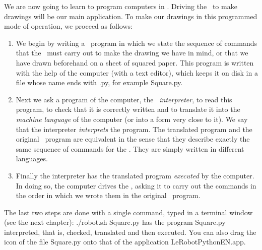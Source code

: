 We are now going to learn to program computers
in \python. Driving the \robot\ to make drawings will be our
main application. To make our drawings in
this programmed mode of operation, we proceed as follows:
\begin{enumerate}
\item We begin by writing a \python\ program in which we
state the sequence of commands that the \robot\ must
carry out to make the drawing we have in mind, or that
we have drawn beforehand on a sheet of squared
paper. This program is written with the help of the computer
(with a text editor), which keeps it on disk in a file whose name ends
with {\idt .py}, for example {\idt Square.py}.
\item  Next we ask a program of the computer, the \python\ {\em in\-ter\-pre\-ter},
to read this program, to check that it is correctly written and to
translate it into the {\em machine language} of the computer
(or into a form very close to it). We say that the interpreter
{\em interprets} the program. The translated program and the original
\python\ program are equivalent in the sense that they describe
exactly the same sequence of commands for the \robot. They are
simply written in different languages.
\item  Finally the interpreter has the translated program {\em executed}
by the computer. In doing so, the computer drives the \robot, asking it
to carry out the commands in the order in which we
wrote them in the original \python\ program.
\end{enumerate}
The last two steps are done with a single command, typed in
a terminal window (see the next chapter):
{\idt ./robot.sh Square.py} has the program {\idt Square.py} interpreted,
that is, checked, translated and then executed. You can also drag
the icon of the file {\idt Square.py} onto that of the application {\idt LeRobotPythonEN.app}.

